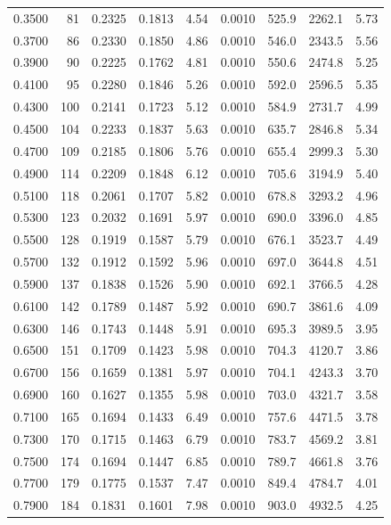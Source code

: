 {\begin{longtable}{lrrrrrrrr}
  0.3500 & 81 & 0.2325 & 0.1813 & 4.54 & 0.0010 & 525.9 & 2262.1 & 5.73 \\
  0.3700 & 86 & 0.2330 & 0.1850 & 4.86 & 0.0010 & 546.0 & 2343.5 & 5.56 \\
  0.3900 & 90 & 0.2225 & 0.1762 & 4.81 & 0.0010 & 550.6 & 2474.8 & 5.25 \\
  0.4100 & 95 & 0.2280 & 0.1846 & 5.26 & 0.0010 & 592.0 & 2596.5 & 5.35 \\
  0.4300 & 100 & 0.2141 & 0.1723 & 5.12 & 0.0010 & 584.9 & 2731.7 & 4.99 \\
  0.4500 & 104 & 0.2233 & 0.1837 & 5.63 & 0.0010 & 635.7 & 2846.8 & 5.34 \\
  0.4700 & 109 & 0.2185 & 0.1806 & 5.76 & 0.0010 & 655.4 & 2999.3 & 5.30 \\
  0.4900 & 114 & 0.2209 & 0.1848 & 6.12 & 0.0010 & 705.6 & 3194.9 & 5.40 \\
  0.5100 & 118 & 0.2061 & 0.1707 & 5.82 & 0.0010 & 678.8 & 3293.2 & 4.96 \\
  0.5300 & 123 & 0.2032 & 0.1691 & 5.97 & 0.0010 & 690.0 & 3396.0 & 4.85 \\
  0.5500 & 128 & 0.1919 & 0.1587 & 5.79 & 0.0010 & 676.1 & 3523.7 & 4.49 \\
  0.5700 & 132 & 0.1912 & 0.1592 & 5.96 & 0.0010 & 697.0 & 3644.8 & 4.51 \\
  0.5900 & 137 & 0.1838 & 0.1526 & 5.90 & 0.0010 & 692.1 & 3766.5 & 4.28 \\
  0.6100 & 142 & 0.1789 & 0.1487 & 5.92 & 0.0010 & 690.7 & 3861.6 & 4.09 \\
  0.6300 & 146 & 0.1743 & 0.1448 & 5.91 & 0.0010 & 695.3 & 3989.5 & 3.95 \\
  0.6500 & 151 & 0.1709 & 0.1423 & 5.98 & 0.0010 & 704.3 & 4120.7 & 3.86 \\
  0.6700 & 156 & 0.1659 & 0.1381 & 5.97 & 0.0010 & 704.1 & 4243.3 & 3.70 \\
  0.6900 & 160 & 0.1627 & 0.1355 & 5.98 & 0.0010 & 703.0 & 4321.7 & 3.58 \\
  0.7100 & 165 & 0.1694 & 0.1433 & 6.49 & 0.0010 & 757.6 & 4471.5 & 3.78 \\
  0.7300 & 170 & 0.1715 & 0.1463 & 6.79 & 0.0010 & 783.7 & 4569.2 & 3.81 \\
  0.7500 & 174 & 0.1694 & 0.1447 & 6.85 & 0.0010 & 789.7 & 4661.8 & 3.76 \\
  0.7700 & 179 & 0.1775 & 0.1537 & 7.47 & 0.0010 & 849.4 & 4784.7 & 4.01 \\
  0.7900 & 184 & 0.1831 & 0.1601 & 7.98 & 0.0010 & 903.0 & 4932.5 & 4.25 \\

\end{longtable}}
